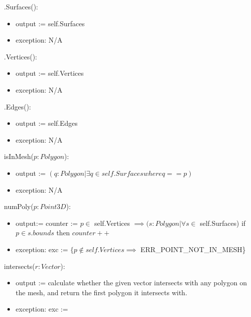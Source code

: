 \documentclass[12pt, titlepage]{article}
\begin{document}
\noindent .Surfaces():
\begin{itemize}
	\item output := self.Surfaces \\
	\item exception: N/A\\
\end{itemize}

\noindent .Vertices():
\begin{itemize}
	\item output := self.Vertices \\
	\item exception: N/A\\
\end{itemize}

\noindent .Edges():
\begin{itemize}
	\item output := self.Edges \\
	\item exception: N/A\\
\end{itemize}

\noindent isInMesh($p:Polygon$):
\begin{itemize}
	\item output := $(q:Polygon|\exists q \in self.Surfaces where q == p)$ \\
	\item exception: N/A\\
\end{itemize}

\noindent numPoly($p:Point3D$):
\begin{itemize}
	\item output:=  counter := $p \in$ self.Vertices $\implies (s:Polygon| 
	\forall s \in$ self.Surfaces) if $p \in s.bounds$ then $counter++$ \\
	\item exception: exc := $\{p \notin self.Vertices \implies$ 
	ERR\_POINT\_NOT\_IN\_MESH\}\\
\end{itemize}

\noindent intersects($r:Vector$):
\begin{itemize}
	\item output := calculate whether the given vector intersects with any 
	polygon on the mesh, and return the first polygon it intersects with.\\
	\item exception: exc := \\
\end{itemize}
\end{document}
